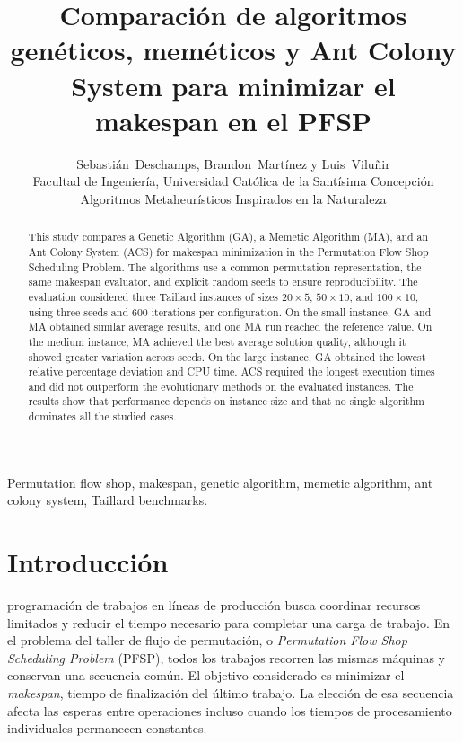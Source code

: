 \documentclass[journal]{IEEEtran}
\begin{document}
\title{Comparación de algoritmos genéticos, meméticos y Ant Colony System para minimizar el makespan en el PFSP}
\author{Sebastián~Deschamps, Brandon~Martínez y Luis~Viluñir\\[0.2em]
\normalsize Facultad de Ingeniería, Universidad Católica de la Santísima Concepción\\
\normalsize Algoritmos Metaheurísticos Inspirados en la Naturaleza}
\maketitle

\begin{abstract}
This study compares a Genetic Algorithm (GA), a Memetic Algorithm (MA), and an Ant Colony System (ACS) for makespan minimization in the Permutation Flow Shop Scheduling Problem. The algorithms use a common permutation representation, the same makespan evaluator, and explicit random seeds to ensure reproducibility. The evaluation considered three Taillard instances of sizes $20\times5$, $50\times10$, and $100\times10$, using three seeds and 600 iterations per configuration. On the small instance, GA and MA obtained similar average results, and one MA run reached the reference value. On the medium instance, MA achieved the best average solution quality, although it showed greater variation across seeds. On the large instance, GA obtained the lowest relative percentage deviation and CPU time. ACS required the longest execution times and did not outperform the evolutionary methods on the evaluated instances. The results show that performance depends on instance size and that no single algorithm dominates all the studied cases.
\end{abstract}
\begin{IEEEkeywords}
Permutation flow shop, makespan, genetic algorithm, memetic algorithm, ant colony system, Taillard benchmarks.
\end{IEEEkeywords}

\section{Introducción}
 programación de trabajos en líneas de producción busca coordinar recursos limitados y reducir el tiempo necesario para completar una carga de trabajo. En el problema del taller de flujo de permutación, o \textit{Permutation Flow Shop Scheduling Problem} (PFSP), todos los trabajos recorren las mismas máquinas y conservan una secuencia común. El objetivo considerado es minimizar el \textit{makespan}, tiempo de finalización del último trabajo. La elección de esa secuencia afecta las esperas entre operaciones incluso cuando los tiempos de procesamiento individuales permanecen constantes.
\end{document}
